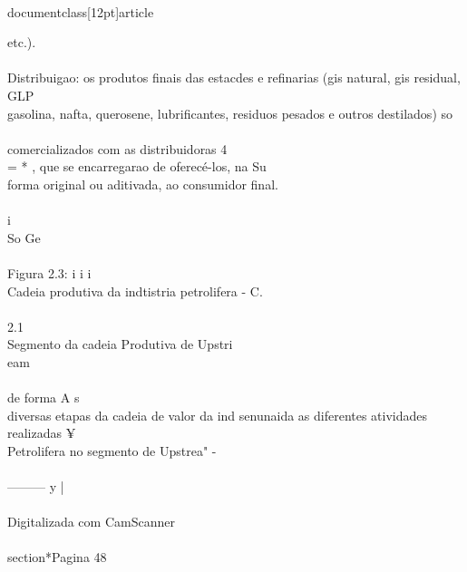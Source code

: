 \\documentclass[12pt]{article}
\begin{document}
etc.).\\
\\
Distribuigao: os produtos finais das estacdes e refinarias (gis natural, gis residual, GLP\\
gasolina, nafta, querosene, lubrificantes, residuos pesados e outros destilados) so\\
\\
comercializados com as distribuidoras 4\\
= * , que se encarregarao de oferecé-los, na Su\\
forma original ou aditivada, ao consumidor final.\\
\\
i\\
So Ge\\
\\
Figura 2.3: i i i\\
Cadeia produtiva da indtistria petrolifera - C.\\
\\
2.1\\
Segmento da cadeia Produtiva de Upstri\\
eam\\
\\
de forma A s\\
diversas etapas da cadeia de valor da ind senunaida as diferentes atividades realizadas ¥\\
Petrolifera no segmento de Upstrea" -\\
\\
——— y |\\
\\
Digitalizada com CamScanner\\

\\section*{Pagina 48}
\end{document}
